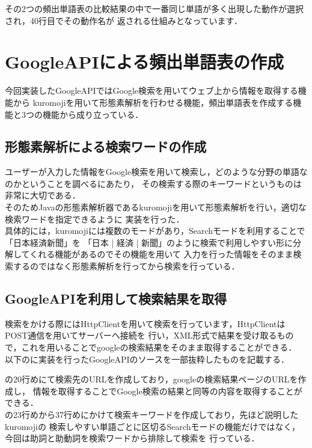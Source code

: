 その2つの頻出単語表の比較結果の中で一番同じ単語が多く出現した動作が選択され，40行目でその動作名が
返される仕組みとなっています．\\

\section{GoogleAPIによる頻出単語表の作成}
今回実装したGoogleAPIではGoogle検索を用いてウェブ上から情報を取得する機能から
kuromojiを用いて形態素解析を行わせる機能，頻出単語表を作成する機能と3つの機能から成り立っている．\\
\subsection{形態素解析による検索ワードの作成}
ユーザーが入力した情報をGoogle検索を用いて検索し，どのような分野の単語なのかということを調べるにあたり，
その検索する際のキーワードというものは非常に大切である．\\

そのためJavaの形態素解析器であるkuromojiを用いて形態素解析を行い，適切な検索ワードを指定できるように
実装を行った．\\

具体的には，kuromojiには複数のモードがあり，Searchモードを利用することで「日本経済新聞」を
「日本 | 経済 | 新聞」のように検索で利用しやすい形に分解してくれる機能があるのでその機能を用いて
入力を行った情報をそのまま検索するのではなく形態素解析を行ってから検索を行っている．\\

\subsection{GoogleAPIを利用して検索結果を取得}
検索をかける際にはHttpClientを用いて検索を行っています，HttpClientはPOST通信を用いてサーバーへ接続を
行い，XML形式で結果を受け取るもので，これを用いることでgoogleの検索結果をそのまま取得することができる．\\

以下のに実装を行ったGoogleAPIのソースを一部抜粋したものを記載する．

の20行めにて検索先のURLを作成しており，googleの検索結果ページのURLを作成し，
情報を取得することでGoogle検索の結果と同等の内容を取得することができる．\\

の23行めから37行めにかけて検索キーワードを作成しており，先ほど説明したkuromojiの
検索しやすい単語ごとに区切るSearchモードの機能だけではなく，今回は助詞と助動詞を検索ワードから排除して検索を
行っている．\\

